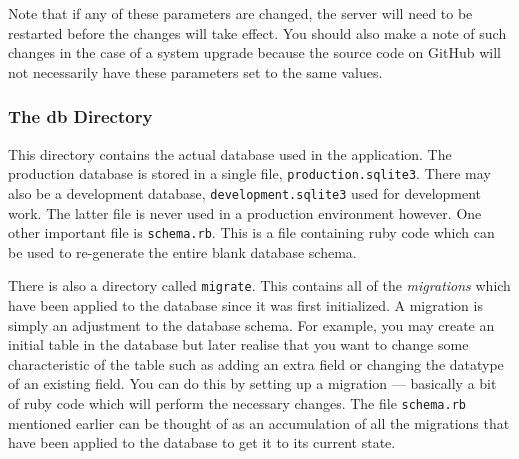 \documentclass[12pt,twoside]{article}
\begin{document}
\begin{plainblock}
Note that if any of these parameters are changed, the server will need
to be restarted before the changes will take effect. You should also
make a note of such changes in the case of a system upgrade because
the source code on GitHub will not necessarily have these parameters
set to the same values.
\end{plainblock}

\subsubsection{The db Directory}
This directory contains the actual database used in the application.
The production database is stored in a single file, \verb=production.sqlite3=.
There may also be a development database, \verb=development.sqlite3= used
for development work. The latter file is never used in a production environment
however. One other important file is \verb=schema.rb=. This is a file
containing ruby code which can be used to re-generate the entire blank
database schema.

There is also a directory called \verb=migrate=. This contains all of the
\emph{migrations} which have been applied to the database since it was
first initialized. A migration is simply an adjustment to the database
schema. For example, you may create an initial table in the database but
later realise that you want to change some characteristic of the table
such as adding an extra field or changing the datatype of an existing field.
You can do this by setting up a migration --- basically a bit of ruby code
which will perform the necessary changes. 
The file \verb=schema.rb= mentioned earlier can be
thought of as an accumulation of all the migrations that have been applied
to the database to get it to its current state.
\end{document}
